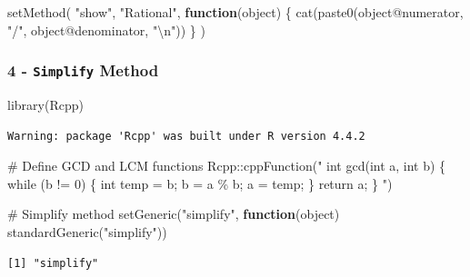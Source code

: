 \documentclass[
  12pt,
]{article}
\newenvironment{Shaded}{\begin{snugshade}}{\end{snugshade}}
\newcommand{\CommentTok}[1]{\textcolor[rgb]{0.37,0.37,0.37}{#1}}
\newcommand{\ControlFlowTok}[1]{\textcolor[rgb]{0.00,0.23,0.31}{\textbf{#1}}}
\newcommand{\FunctionTok}[1]{\textcolor[rgb]{0.28,0.35,0.67}{#1}}
\newcommand{\NormalTok}[1]{\textcolor[rgb]{0.00,0.23,0.31}{#1}}
\newcommand{\SpecialCharTok}[1]{\textcolor[rgb]{0.37,0.37,0.37}{#1}}
\newcommand{\StringTok}[1]{\textcolor[rgb]{0.13,0.47,0.30}{#1}}
\begin{document}
\begin{Shaded}
\begin{Highlighting}[]
\FunctionTok{setMethod}\NormalTok{(}
  \StringTok{"show"}\NormalTok{,}
  \StringTok{"Rational"}\NormalTok{,}
  \ControlFlowTok{function}\NormalTok{(object) \{}
    \FunctionTok{cat}\NormalTok{(}\FunctionTok{paste0}\NormalTok{(object}\SpecialCharTok{@}\NormalTok{numerator, }\StringTok{"/"}\NormalTok{, object}\SpecialCharTok{@}\NormalTok{denominator, }\StringTok{"}\SpecialCharTok{\textbackslash{}n}\StringTok{"}\NormalTok{))}
\NormalTok{  \}}
\NormalTok{)}
\end{Highlighting}
\end{Shaded}

\subsubsection{\texorpdfstring{4 - \texttt{Simplify}
Method}{4 - Simplify Method}}\label{simplify-method}

\begin{Shaded}
\begin{Highlighting}[]
\FunctionTok{library}\NormalTok{(Rcpp)}
\end{Highlighting}
\end{Shaded}

\begin{verbatim}
Warning: package 'Rcpp' was built under R version 4.4.2
\end{verbatim}

\begin{Shaded}
\begin{Highlighting}[]
\CommentTok{\# Define GCD and LCM functions}
\NormalTok{Rcpp}\SpecialCharTok{::}\FunctionTok{cppFunction}\NormalTok{(}\StringTok{"}
\StringTok{int gcd(int a, int b) \{}
\StringTok{  while (b != 0) \{}
\StringTok{    int temp = b;}
\StringTok{    b = a \% b;}
\StringTok{    a = temp;}
\StringTok{  \}}
\StringTok{  return a;}
\StringTok{\}}
\StringTok{"}\NormalTok{)}

\CommentTok{\# Simplify method}
\FunctionTok{setGeneric}\NormalTok{(}\StringTok{"simplify"}\NormalTok{, }\ControlFlowTok{function}\NormalTok{(object) }\FunctionTok{standardGeneric}\NormalTok{(}\StringTok{"simplify"}\NormalTok{))}
\end{Highlighting}
\end{Shaded}

\begin{verbatim}
[1] "simplify"
\end{verbatim}
\end{document}

